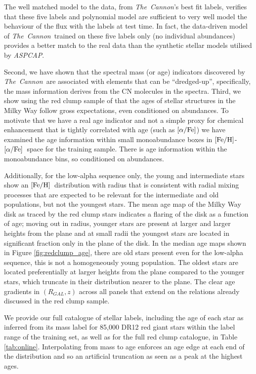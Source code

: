 \documentclass[12pt, preprint]{aastex}
\newcommand{\project}[1]{\textsl{#1}}
\newcommand{\tc}{\project{The~Cannon}}
\newcommand{\aspcap}{\project{ASPCAP}}
\newcommand{\feh}{\mbox{$\rm [Fe/H]$}}
\newcommand{\alphafe}{\mbox{$\rm [\alpha/Fe]$}}
\begin{document}
The well matched model to the data, from \tc's best fit labels, verifies that these five labels and polynomial model are sufficient to very well model the behaviour of the flux with the labels at test time.  In fact, the data-driven model of \tc\ trained on these five labels only (no individual abundances) provides a better match to the real data than the synthetic stellar models utilised by \aspcap.

Second, we have shown that the spectral mass (or age) indicators discovered by \tc\ are associated with elements that can be ``dredged-up'', specifically, the mass information derives from the CN molecules in the spectra. Third, we show using the red clump sample of \citet{Bovy2014} that the ages of stellar structures in the Milky Way follow gross expectations, even conditioned on abundances. To motivate that we have a real age indicator and not a simple proxy for chemical enhancement that is tightly correlated with age (such as \alphafe) we have examined the age information within small monoabundance boxes in \feh-\alphafe\ space for the training sample. There is age information within the monoabundance bins, so conditioned on abundances. 

Additionally, for the low-alpha sequence only, the young and intermediate stars show an \feh\ distribution with radius that is consistent with radial mixing processes that are expected to be relevant for the intermediate and old populations, but not the youngest stars.  The mean age map of the Milky Way disk as traced by the red clump stars indicates a flaring of the disk as a function of age; moving out in radius, younger stars are present at larger and larger heights from the plane and at small radii the youngest stars are located in significant fraction only in the plane of the disk. In the median age maps shown in Figure \ref{fig:redclump_age}, there are old stars present even for the low-alpha sequence, this is not a homogeneously young population. The oldest stars are located preferentially at larger heights from the plane compared to the younger stars, which truncate in their distribution nearer to the plane.  The clear age gradients in $(R_{GAL},z)$ across all panels that extend on the relations already discussed in the red clump sample.

We provide our full catalogue of stellar labels, including the age of each star as inferred from its mass label for 85,000 DR12 red giant stars within the label range of the training set, as well as for the full red clump catalogue, in Table \ref{tab:online}.  Interpolating from mass to age enforces an age edge at each end of the distribution and so an artificial truncation as seen as a peak at the highest ages. %
\end{document}
